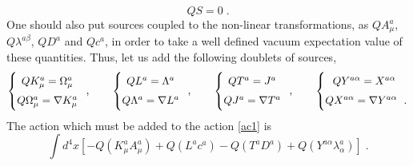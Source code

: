 \begin{appendix}
\begin{equation}
QS = 0\;.
\end{equation}
%
%
%
One should also put sources coupled to the non-linear transformations, as $QA^{a}_{\mu}$, $Q\lambda^{a\beta}$, $QD^{a}$ and $Qc^{a}$, in order to take a well defined vacuum expectation value of these quantities. Thus, let us add the following doublets of sources,
\begin{equation}
\left\{\begin{matrix}QK^{a}_{\mu}=\Omega^{a}_{\mu}\phantom{\Bigl|}\cr
Q\Omega^{a}_{\mu}=\nabla K^{a}_{\mu}\phantom{\Bigl|}\end{matrix}\right.\,,\qquad
\left\{\begin{matrix}QL^{a}=\Lambda^{a}\phantom{\Bigl|}\cr
Q\Lambda^{a}=\nabla L^{a}\phantom{\Bigl|}\end{matrix}\right.\,,\qquad
\left\{\begin{matrix}QT^{a}=J^{a}\phantom{\Bigl|}\cr
QJ^{a}=\nabla T^{a}\phantom{\Bigl|}\end{matrix}\right.\,,\qquad
\left\{\begin{matrix}QY^{a\alpha}=X^{a\alpha}\phantom{\Bigl|}\cr
QX^{a\alpha}=\nabla Y^{a\alpha}\phantom{\Bigl|}\;.\end{matrix}\right.
\end{equation}
%
%
The action which must be added to the action \eqref{ac1} is
\begin{equation}
\int d^{4}x \left[ -Q(K^{a}_{\mu} A^{a}_{\mu}) + Q(L^{a}c^{a}) - Q(T^{a}D^{a}) + Q(Y^{a\alpha}\lambda^{a}_{\alpha}) \right]\;.
\end{equation}


\end{appendix}
